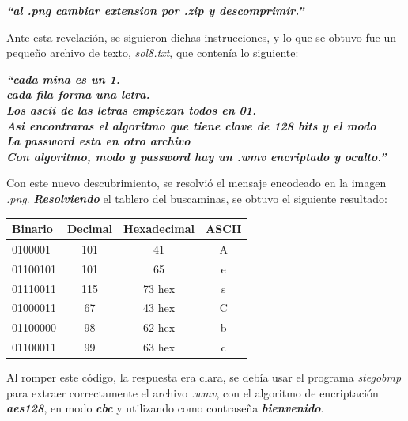 \documentclass[a4paper,10pt]{article}
\begin{document}
\begin{center}
\textbf{\textit{    ``al .png cambiar extension por .zip y descomprimir.''}}
\end{center}

Ante esta revelación, se siguieron dichas instrucciones, y lo que se obtuvo fue un pequeño archivo de texto, \textit{sol8.txt}, que contenía lo siguiente:

\begin{center}
\textbf{\textit{
    ``cada mina es un 1.\\
    cada fila forma una letra.\\
    Los ascii de las letras empiezan todos en 01.\\
    Asi encontraras el algoritmo que tiene clave de 128 bits y el modo\\
    La password esta en otro archivo\\
    Con algoritmo, modo y password hay un .wmv encriptado y oculto.''
}}
\end{center}

Con este nuevo descubrimiento, se resolvió el mensaje encodeado en la imagen \textit{.png}. \textit{\textbf{Resolviendo}} el tablero del buscaminas, se obtuvo el siguiente resultado:
\begin{center}
\begin{tabular}{|l|c|c|c|}
    \hline
    Binario       & Decimal       & Hexadecimal   & ASCII \\
    \hline
    0100001       & 101           & 41            & A     \\
    \hline
    01100101      & 101           & 65            & e     \\
    \hline
    01110011      & 115           & 73 hex        & s     \\
    \hline
    01000011      & 67            & 43 hex        & C     \\
    \hline
    01100000      & 98            & 62 hex        & b     \\
    \hline
    01100011      & 99            & 63 hex        & c     \\
    \hline
\end{tabular}
\end{center}

Al romper este código, la respuesta era clara, se debía usar el programa \textit{stegobmp} para extraer correctamente el archivo \textit{.wmv}, con el algoritmo de encriptación
\textit{\textbf{aes128}}, en modo \textit{\textbf{cbc}} y utilizando como contraseña \textit{\textbf{bienvenido}}.\\
\end{document}
